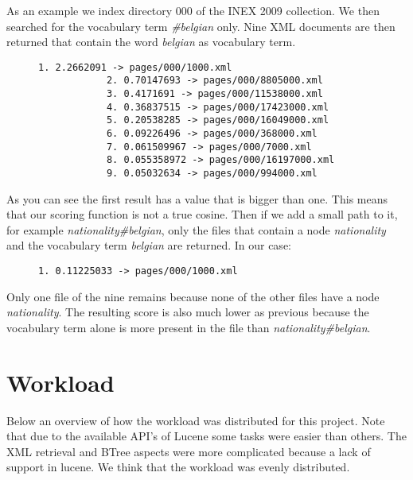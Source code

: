 \documentclass{article}
\begin{document}
As an example we index directory 000 of the INEX 2009 collection.
We then searched for the vocabulary term \emph{\#belgian} only. Nine XML documents are then returned that contain the word \emph{belgian} as vocabulary term.
\begin{figure}[H]
	\begin{minipage}{0.5\textwidth}
		\centering
		\begin{lstlisting}[basicstyle=\tiny\ttfamily, caption={Search results for \#belgian}]
			1. 2.2662091 -> pages/000/1000.xml
			2. 0.70147693 -> pages/000/8805000.xml
			3. 0.4171691 -> pages/000/11538000.xml
			4. 0.36837515 -> pages/000/17423000.xml
			5. 0.20538285 -> pages/000/16049000.xml
			6. 0.09226496 -> pages/000/368000.xml
			7. 0.061509967 -> pages/000/7000.xml
			8. 0.055358972 -> pages/000/16197000.xml
			9. 0.05032634 -> pages/000/994000.xml
		\end{lstlisting}
	\end{minipage}
\end{figure}
As you can see the first result has a value that is bigger than one. This means that our scoring function is not a true cosine.
Then if we add a small path to it, for example \emph{nationality\#belgian}, only the files that contain a node \emph{nationality} and the vocabulary term \emph{belgian}
are returned.
In our case:
\begin{figure}[H]
	\begin{minipage}{0.5\textwidth}
		\centering
		\begin{lstlisting}[basicstyle=\tiny\ttfamily, caption={Search results for nationality\#belgian}]
			1. 0.11225033 -> pages/000/1000.xml
		\end{lstlisting}
	\end{minipage}
\end{figure}
Only one file of the nine remains because none of the other files have a node \emph{nationality}.
The resulting score is also much lower as previous because the vocabulary term alone is more present in the file than \emph{nationality\#belgian}.

\section{Workload}
Below an overview of how the workload was distributed for this project. Note that due to the available API's of Lucene some tasks were easier than others. The XML retrieval and BTree aspects were more complicated because a lack of support in lucene. We think that the workload was evenly distributed.
\end{document}

